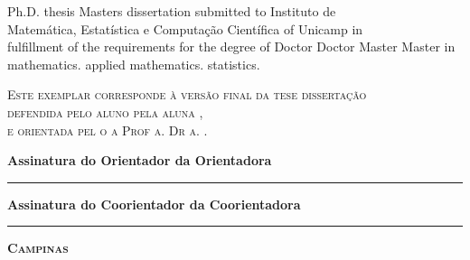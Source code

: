 \begin{flushright}
  \begin{minipage}[c]{.8\textwidth}
    \begin{flushright}
      \ifx\mestrado\undefined
      Ph.D. thesis
      \else
      Masters dissertation
      \fi
      submitted to Instituto de \\ Matem\'atica,
      Estat\'istica e Computa\c c\~ao Cient\'ifica
      of Unicamp in \\
      fulfillment of the requirements for the degree of
      \ifx\mestrado\undefined
      \ifx\femaleAuthor\undefined
      Doctor
      \else
      Doctor
      \fi
      \else
      \ifx\femaleAuthor\undefined
      Master
      \else
      Master
      \fi
      \fi
      in
      \ifx\matematica\undefined
      \else
      mathematics.
      \fi
      \ifx\aplicada\undefined
      \else
      applied mathematics.
      \fi
      \ifx\estatistica\undefined
      \else
      statistics.
      \fi
    \end{flushright}
  \end{minipage}
\end{flushright}

\vspace{.2cm}
\noindent
{\footnotesize \scshape
Este exemplar corresponde à versão final da 
\ifx\mestrado\undefined
tese
\else
dissertação
\fi \\
defendida 
\ifx\femaleAuthor\undefined
pelo aluno
\else
pela aluna
\fi
\autor,\\
e orientada pel\ifx\femaleOrientador\undefined
o \else
a \fi Prof\ifx\femaleOrientador\undefined
\else
a\fi. Dr\ifx\femaleOrientador\undefined
\else
a\fi. \orientador.
}
\vspace{.5cm}

\noindent
{\small \bfseries
\noindent
Assinatura
\ifx\femaleOrientador\undefined
do Orientador
\else
da Orientadora
\fi

\vspace{.4cm}
\noindent
\rule[1pt]{7cm}{.5pt}  %
}
\vspace{.4cm}

\ifx\coorientador\undefined
\else
{\small \bfseries
\noindent
Assinatura
\ifx\femaleCoorientador\undefined
do Coorientador
\else
da Coorientadora
\fi

\vspace{.4cm}
\noindent
\rule[1pt]{7cm}{.5pt}  %
}
\fi
\vfill
\begin{center}
  {\small \scshape \bfseries Campinas \\ \ano}
\end{center}
